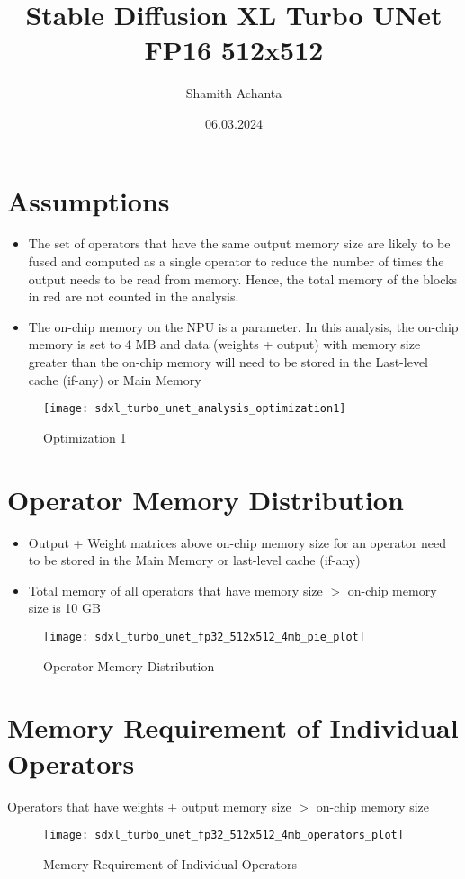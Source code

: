\documentclass[12pt, letter, landscape]{article}
\begin{document}
\title{Stable Diffusion XL Turbo UNet FP16 512x512}
\author{Shamith Achanta}
\date{06.03.2024}

\maketitle

\section{Assumptions}
\begin{itemize}
	\item The set of operators that have the same output memory size are likely to be fused and computed as a single operator to reduce the number of times the output needs to be read from memory. Hence, the total memory of the blocks in red are not counted in the analysis.
	\item The on-chip memory on the NPU is a parameter. In this analysis, the on-chip memory is set to 4 MB and data (weights + output) with memory size greater than the on-chip memory will need to be stored in the Last-level cache (if-any) or Main Memory
\end{itemize}

\begin{figure}[h]
\caption{Optimization 1}
\centering
\texttt{[image: sdxl\_turbo\_unet\_analysis\_optimization1]}
\end{figure}

\clearpage

\section{Operator Memory Distribution}
\begin{itemize}
	\item Output + Weight matrices above on-chip memory size for an operator need to be stored in the Main Memory or last-level cache (if-any)
	\item Total memory of all operators that have memory size $>$ on-chip memory size is 10 GB
\end{itemize}

\begin{figure}[h]
\caption{Operator Memory Distribution}
\centering
\texttt{[image: sdxl\_turbo\_unet\_fp32\_512x512\_4mb\_pie\_plot]}
\end{figure}

\clearpage

\section{Memory Requirement of Individual Operators}
Operators that have weights + output memory size $>$ on-chip memory size

\begin{figure}[h]
\caption{Memory Requirement of Individual Operators}
\centering
\texttt{[image: sdxl\_turbo\_unet\_fp32\_512x512\_4mb\_operators\_plot]}
\end{figure}

\clearpage
\end{document}
